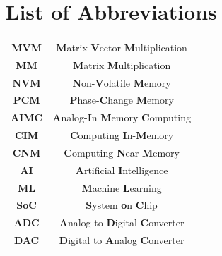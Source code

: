 \chapter*{List of Abbreviations}\label{chap:LOA}

\begin{center}
    
\begingroup
\setlength{\tabcolsep}{10pt} 
\renewcommand{\arraystretch}{1.5} 
\begin{tabular}{ c c }
\textbf{MVM} & \textbf{M}atrix \textbf{V}ector \textbf{M}ultiplication \\
\textbf{MM} & \textbf{M}atrix \textbf{M}ultiplication\\
\textbf{NVM} & \textbf{N}on-\textbf{V}olatile \textbf{M}emory\\
\textbf{PCM} & \textbf{P}hase-\textbf{C}hange \textbf{M}emory\\
\textbf{AIMC} & \textbf{A}nalog-\textbf{I}n \textbf{M}emory \textbf{C}omputing\\
\textbf{CIM} & \textbf{C}omputing \textbf{I}n-\textbf{M}emory\\
\textbf{CNM} & \textbf{C}omputing \textbf{N}ear-\textbf{M}emory\\
\textbf{AI} & \textbf{A}rtificial \textbf{I}ntelligence\\
\textbf{ML} & \textbf{M}achine \textbf{L}earning\\
\textbf{SoC} & \textbf{S}ystem \textbf{o}n \textbf{C}hip\\
\textbf{ADC} & \textbf{A}nalog to \textbf{D}igital \textbf{C}onverter\\
\textbf{DAC} & \textbf{D}igital to \textbf{A}nalog \textbf{C}onverter\\


\end{tabular}
\endgroup
\end{center}
